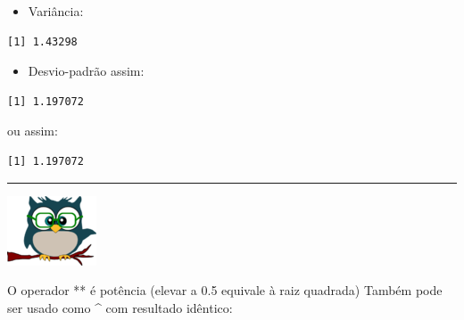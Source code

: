 \documentclass[
]{article}
\newenvironment{Shaded}{\begin{snugshade}}{\end{snugshade}}
\newcommand{\FloatTok}[1]{\textcolor[rgb]{0.00,0.00,0.81}{#1}}
\newcommand{\FunctionTok}[1]{\textcolor[rgb]{0.00,0.00,0.00}{#1}}
\newcommand{\NormalTok}[1]{#1}
\newcommand{\SpecialCharTok}[1]{\textcolor[rgb]{0.00,0.00,0.00}{#1}}
\providecommand{\tightlist}{%
  \setlength{\itemsep}{0pt}\setlength{\parskip}{0pt}}
\begin{document}
\begin{itemize}
\tightlist
\item
  Variância:
\end{itemize}

\begin{Shaded}
\end{Shaded}

\begin{verbatim}
[1] 1.43298
\end{verbatim}

\begin{itemize}
\tightlist
\item
  Desvio-padrão assim:
\end{itemize}

\begin{Shaded}
\end{Shaded}

\begin{verbatim}
[1] 1.197072
\end{verbatim}

ou assim:

\begin{Shaded}
\end{Shaded}

\begin{verbatim}
[1] 1.197072
\end{verbatim}

\begin{center}\rule{0.5\linewidth}{0.5pt}\end{center}

\begin{flushleft}\includegraphics[width=0.08\linewidth]{coruja} \end{flushleft}

O operador ** é potência (elevar a 0.5 equivale à raiz quadrada) Também
pode ser usado como \^{} com resultado idêntico:
\end{document}
